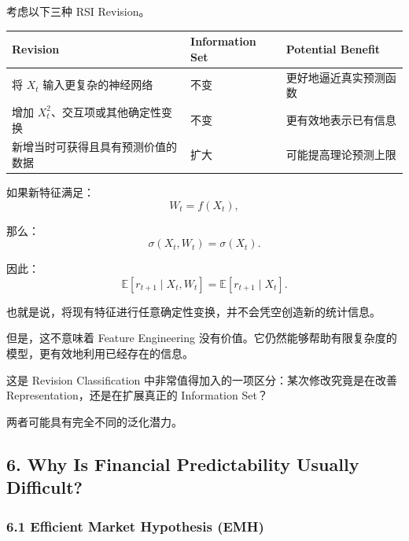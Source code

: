考虑以下三种 RSI Revision。

\begin{readertable}
\begin{longtable}[]{@{}
  >{\raggedright\arraybackslash}p{}
  >{\raggedright\arraybackslash}p{}
  >{\raggedright\arraybackslash}p{}@{}}
\toprule
Revision & Information Set & Potential Benefit \\
\midrule
\endhead
将 \(X_t\) 输入更复杂的神经网络 & 不变 & 更好地逼近真实预测函数 \\
增加 \(X_t^2\)、交互项或其他确定性变换 & 不变 & 更有效地表示已有信息 \\
新增当时可获得且具有预测价值的数据 & 扩大 & 可能提高理论预测上限 \\
\bottomrule
\end{longtable}
\end{readertable}

如果新特征满足：
\[W_t=f(X_t),\]

那么：
\[\sigma(X_t,W_t)=\sigma(X_t).\]

因此：
\[\boxed{
\mathbb E[r_{t+1}\mid X_t,W_t]
=
\mathbb E[r_{t+1}\mid X_t].
}\]

也就是说，将现有特征进行任意确定性变换，并不会凭空创造新的统计信息。

但是，这不意味着 Feature Engineering 没有价值。它仍然能够帮助有限复杂度的模型，更有效地利用已经存在的信息。


这是 Revision Classification 中非常值得加入的一项区分：某次修改究竟是在改善 Representation，还是在扩展真正的 Information Set？

两者可能具有完全不同的泛化潜力。

\hypertarget{part-4-60-0001-why-is-financial-predictability-usually-difficult}{%
\subsection{6. Why Is Financial Predictability Usually Difficult?}\label{part-4-60-0001-why-is-financial-predictability-usually-difficult}}

\hypertarget{part-4-60-0001-efficient-market-hypothesis-emh}{%
\subsubsection{6.1 Efficient Market Hypothesis (EMH)}\label{part-4-60-0001-efficient-market-hypothesis-emh}}


